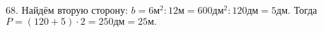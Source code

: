 68. Найдём вторую сторону: $b=6\text{м}^2:12\text{м}=600\text{дм}^2:120\text{дм}=5\text{дм}.$ Тогда $P=(120+5)\cdot2=250\text{дм}=25\text{м}.$\\
